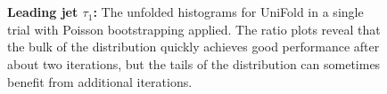 \begin{figure}[]
\centering
\ContinuedFloat
{}\\
\\
\caption{\textbf{Leading jet $\tau_1$:} The unfolded histograms for UniFold in a single trial with Poisson bootstrapping applied. The ratio plots reveal that the bulk of the distribution quickly achieves good performance after about two iterations, but the tails of the distribution can sometimes benefit from additional iterations.}
\label{fig:num_iterations:tau1_ratios}
\end{figure}


